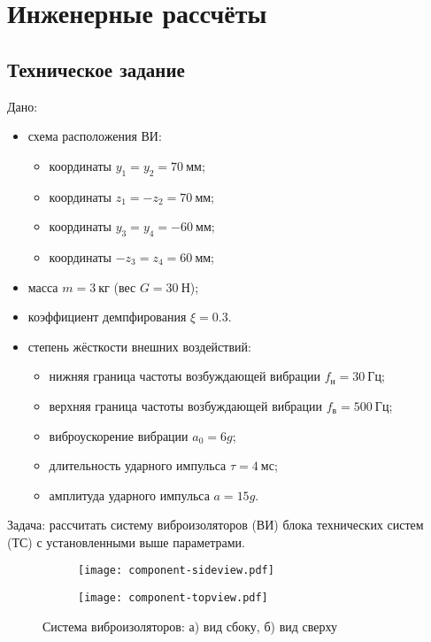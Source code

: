 \chapter{Инженерные рассчёты}

\section{Техническое задание}

Дано:
\begin{itemize}
    \item схема расположения ВИ:
        \begin{itemize}
            \item координаты $y_1  = y_2  = 70~мм$;
            \item координаты $z_1  = -z_2 = 70~мм$;
            \item координаты $y_3  = y_4  = -60~мм$;
            \item координаты $-z_3 = z_4  = 60~мм$;
        \end{itemize}
    \item масса $m = 3~кг$ (вес $G = 30~Н$);
    \item коэффициент демпфирования $\xi = 0.3$.
    \item степень жёсткости внешних воздействий:
        \begin{itemize}
            \item нижняя граница частоты возбуждающей вибрации $f_{н} = 30~Гц$;
            \item верхняя граница частоты возбуждающей вибрации $f_{в} = 500~Гц$;
            \item виброускорение вибрации $a_0 = 6g$;
            \item длительность ударного импульса $\tau = 4~мс$;
            \item амплитуда ударного импульса $a = 15g$.
        \end{itemize}
\end{itemize}

Задача: рассчитать систему виброизоляторов (ВИ) блока технических систем (ТС) с установленными выше параметрами.

\begin{figure}[!h]
    \centering
    \begin{subfigure}[t]{0.5\textwidth}
        \centering
        \texttt{[image: component-sideview.pdf]}
        \caption{}
    \end{subfigure}
    \begin{subfigure}[t]{0.5\textwidth}
        \centering
        \texttt{[image: component-topview.pdf]}
        \caption{}
    \end{subfigure}
    \caption{Система виброизоляторов: а) вид сбоку, б) вид сверху}
\end{figure}


